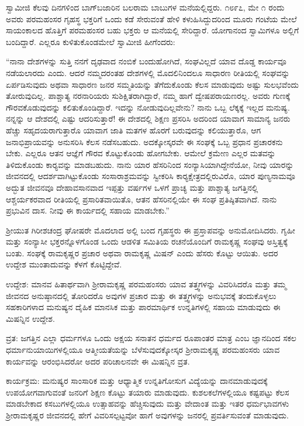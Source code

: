  ಸ್ವಾಮೀಜಿ ಕೆಲವು ದಿನಗಳಿಂದ ಬಾಗ್‍ಬಜಾರಿನ ಬಲರಾಮ ಬಾಬುಗಳ ಮನೆಯಲ್ಲಿದ್ದರು. ೧೮೯೭, ಮೇ ೧ ರಂದು ಅವರು ಪರಮಹಂಸರ ಗೃಹಸ್ಥ ಭಕ್ತರಿಗೆ ಒಂದು ಕಡೆ ಸೇರುವಂತೆ ಹೇಳಿ ಕಳುಹಿಸಿದ್ದುದರಿಂದ ಮೂರು ಗಂಟೆಯ ಮೇಲೆ ಸಾಯಂಕಾಲದ ಹೊತ್ತಿಗೆ ಪರಮಹಂಸರ ಬಹು ಭಕ್ತರು ಆ ಮನೆಯಲ್ಲಿ ಸೇರಿದ್ದಾರೆ. ಯೋಗಾನಂದ ಸ್ವಾಮಿಗಳೂ ಅಲ್ಲಿಗೆ ಬಂದಿದ್ದಾರೆ. ಎಲ್ಲರೂ ಕುಳಿತುಕೊಂಡಮೇಲೆ ಸ್ವಾಮೀಜಿ ಹೀಗೆಂದರು: 

 “ನಾನಾ ದೇಶಗಳನ್ನು ಸುತ್ತಿ ನನಗೆ ದೃಢವಾದ ನಂಬಿಕೆ ಬಂದುಹೋಗಿದೆ, ಸಂಘವಿಲ್ಲದೆ ಯಾವ ದೊಡ್ಡ ಕಾರ್ಯವೂ ನಡೆಯಲಾರದು ಎಂದು. ಆದರೆ ನಮ್ಮದರಂತಹ ದೇಶಗಳಲ್ಲಿ ಮೊದಲಿನಿಂದಲೂ ಸಾಧಾರಣ ರೀತಿಯಲ್ಲಿ ಸಂಘವನ್ನು ಏರ್ಪಡಿಸುವುದು ಅಥವಾ ಸಾಧಾರಣ ಜನರ ಸಮ್ಮತಿಯನ್ನು ತೆಗೆದುಕೊಂಡು ಕೆಲಸ ಮಾಡುವುದು ಅಷ್ಟು ಸುಲಭವೆಂದು ತೋರುವುದಿಲ್ಲ. ಪಾಶ್ಚಾತ್ಯ ನರನಾರಿಯರು ಸುಶಿಕ್ಷಿತರಾಗಿದ್ದಾರೆ, ನಮ್ಮ ಹಾಗೆ ದ್ವೇಷಪರಾಯಣರಲ್ಲ. ಅವರು ಗುಣಕ್ಕೆ ಗೌರವಕೊಡುವುದನ್ನು ಕಲಿತುಕೊಂಡಿದ್ದಾರೆ. ಇದನ್ನು ನೋಡುವುದಿಲ್ಲವೇನು? ನಾನು ಒಬ್ಬ ಲೆಕ್ಕಕ್ಕೆ ಇಲ್ಲದ ಮನುಷ್ಯ. ನನ್ನನ್ನು ಆ ದೇಶದಲ್ಲಿ ಎಷ್ಟು ಆದರಿಸುತ್ತಾರೆ! ಈ ದೇಶದಲ್ಲಿ ಶಿಕ್ಷಣ ಪ್ರಸರಿಸಿ ಅದರಿಂದ ಯಾವಾಗ ಸಾಮಾನ್ಯ ಜನರು ಹೆಚ್ಚು ಸಹೃದಯರಾಗುತ್ತಾರೊ ಯಾವಾಗ ಜಾತಿ ಮತಗಳ ಹೊರಗೆ ಬರುವುದನ್ನು ಕಲಿಯುತ್ತಾರೊ, ಆಗ ಜನಾಭಿಪ್ರಾಯವನ್ನು ಅನುಸರಿಸಿ ಕೆಲಸ ನಡೆಸಬಹುದು. ಅದಕ್ಕೋಸ್ಕರವೇ ಈ ಸಂಘಕ್ಕೆ ಒಬ್ಬ ಪ್ರಧಾನ ಪ್ರಚಾರಕನು ಬೇಕು. ಎಲ್ಲರೂ ಆತನ ಆಜ್ಞೆಗೆ ಗೌರವ ಕೊಟ್ಟುಕೊಂಡು ಹೋಗಬೇಕು. ಆಮೇಲೆ ಕ್ರಮೇಣ ಎಲ್ಲರ ಮತವನ್ನು ತಿಳಿದುಕೊಂಡು ಕಾರ‍್ಯವನ್ನು ಮಾಡಬಹುದು. ನಾನು ಯಾರ ಹೆಸರಿನಿಂದ ಸಂನ್ಯಾಸಿಯಾಗಿದ್ದೇನೆಯೋ, ನೀವು ಯಾರನ್ನು ಜೀವನದಲ್ಲಿ ಆದರ್ಶವಾಗಿಟ್ಟುಕೊಂಡು ಸಂಸಾರಾಶ್ರಮವನ್ನು ಸ್ವೀಕರಿಸಿ ಕಾರ‍್ಯಕ್ಷೇತ್ರದಲ್ಲಿರುವಿರೊ, ಯಾರ ಪುಣ್ಯನಾಮವೂ ಅದ್ಭುತ ಜೀವನವೂ‌ ದೇಹಾವಸಾನವಾದ ಇಪ್ಪತ್ತು ವರ್ಷಗಳ ಒಳಗೆ ಪ್ರಾಚ್ಯ ಮತ್ತು ಪಾಶ್ಚಾತ್ಯ ಜಗತ್ತಿನಲ್ಲಿ ಆಶ್ಚರ್ಯಕರವಾದ ರೀತಿಯಲ್ಲಿ ಪ್ರಸಾರಿತವಾಯಿತೊ, ಆತನ ಹೆಸರಿನಲ್ಲಿಯೇ ಈ ಸಂಘ ಪ್ರತಿಷ್ಠಿತವಾಗಿದೆ. ನಾನು ಪ್ರಭುವಿನ ದಾಸ. ನೀವು ಈ ಕಾರ್ಯದಲ್ಲಿ ಸಹಾಯ ಮಾಡಬೇಕು.” 

 ಶ‍್ರೀಯುತ ಗಿರೀಶಚಂದ್ರ ಘೋಷರೇ ಮೊದಲಾದ ಅಲ್ಲಿ ಬಂದ ಗೃಹಸ್ಥರು ಈ ಪ್ರಸ್ತಾಪವನ್ನು ಅನುಮೋದಿಸಿದರು. ಗೃಹೀ ಮತ್ತು ಸಂನ್ಯಾಸೀ ಭಕ್ತರನ್ನೊಳಗೊಂಡ ಒಂದು ಆಡಳಿತ ಸಮಿತಿಯ ರಚನೆಯೊಂದಿಗೆ ರಾಮಕೃಷ್ಣ ಸಂಘವು ಅಸ್ತಿತ್ವಕ್ಕೆ ಬಂತು. ಸಂಘಕ್ಕೆ ರಾಮಕೃಷ್ಣರ ಪ್ರಚಾರ ಅಥವಾ ರಾಮಕೃಷ್ಣ ಮಿಷನ್ ಎಂದು ಹೆಸರು ಕೊಟ್ಟು ಆಯಿತು. ಅದರ ಉದ್ದೇಶ ಮುಂತಾದುವನ್ನು ಕೆಳಗೆ ಕೊಟ್ಟಿದ್ದೇವೆ. 

 ಉದ್ದೇಶ: ಮಾನವ ಹಿತಾರ್ಥವಾಗಿ ಶ‍್ರೀರಾಮಕೃಷ್ಣ ಪರಮಹಂಸರು ಯಾವ ತತ್ತ್ವಗಳನ್ನು ವಿವರಿಸಿದರೊ ಮತ್ತು ತಮ್ಮ ಜೀವನದ ಅನುಷ್ಠಾನದಲ್ಲಿ ತೋರಿದರೊ ಅವುಗಳ ಪ್ರಚಾರ ಮತ್ತು ಈ ತತ್ತ್ವಗಳನ್ನು ಅನುಭವಕ್ಕೆ ತಂದುಕೊಳ್ಳಲು ಸಹಕಾರಿಗಳಾದ ಮನುಷ್ಯನ ದೈಹಿಕ ಮಾನಸಿಕ ಮತ್ತು ಪಾರಮಾರ್ಥಿಕ ಉನ್ನತಿಗಳಲ್ಲಿ ಸಹಾಯ ಮಾಡುವುದು ಈ ಮಿಷನ್ನಿನ ಉದ್ದೇಶ. 

 ವ್ರತ: ಜಗತ್ತಿನ ಎಲ್ಲಾ ಧರ್ಮಗಳೂ ಒಂದು ಅಕ್ಷಯ ಸನಾತನ ಧರ್ಮದ ರೂಪಾಂತರ ಮಾತ್ರ ಎಂಬ ಜ್ಞಾನದಿಂದ ಸಕಲ ಧರ್ಮಾನುಯಾಯಿಗಳಲ್ಲಿಯೂ ಆತ್ಮೀಯತೆಯನ್ನು ಬೆಳೆಸುವುದಕ್ಕೋಸ್ಕರ ಶ‍್ರೀರಾಮಕೃಷ್ಣ ಪರಮಹಂಸರು ಯಾವ ಕಾರ್ಯವನ್ನು ಆರಂಭಿಸಿದರೋ ಅದರ ಪರಿಚಾಲನವೇ ಈ ಮಿಷನ್ನಿನ ವ್ರತ. 

 ಕಾರ್ಯಕ್ರಮ: ಮನುಷ್ಯರ ಸಾಂಸಾರಿಕ ಮತ್ತು ಆಧ್ಯಾತ್ಮಿಕ ಉನ್ನತಿಗೋಸುಗ ವಿದ್ಯೆಯನ್ನು ದಾನಮಾಡುವುದಕ್ಕೆ ಉಪಯೋಗವಾಗುವಂತೆ ಜನರಿಗೆ ಶಿಕ್ಷಣ ಕೊಟ್ಟು ತಯಾರು ಮಾಡುವುದು. ಕುಶಲಕಲೆಗಳಲ್ಲಿಯೂ ಕಷ್ಟಪಟ್ಟು ಕೆಲಸ ಮಾಡಬೇಕಾದ ಕಸಬುಗಳಲ್ಲಿಯೂ ಉತ್ಸಾಹವನ್ನು ಹೆಚ್ಚಿಸುವುದು ಮತ್ತು ವೇದಾಂತ ಮತ್ತು ಇತರ ಧರ್ಮಭಾವಗಳು ಶ‍್ರೀರಾಮಕೃಷ್ಣರ ಜೀವನದಲ್ಲಿ ಹೇಗೆ ವಿವರಿಸಲ್ಪಟ್ಟವೋ‌ ಹಾಗೆ ಅವುಗಳನ್ನು ಜನರಲ್ಲಿ ಪ್ರವರ್ತಿಸುವಂತೆ ಮಾಡುವುದು. 

